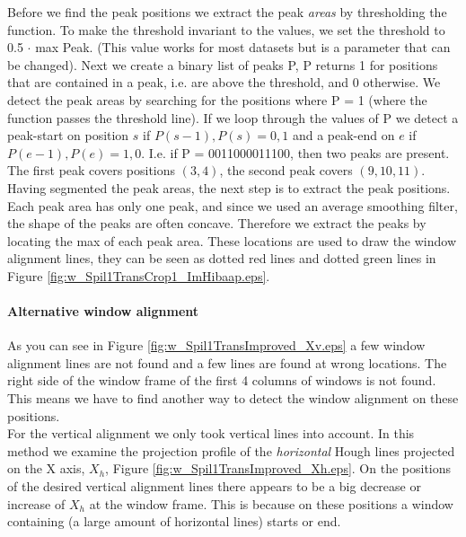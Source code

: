 Before we find the peak positions we extract the peak \emph{areas} by thresholding the
function. To make the threshold invariant to the values, we set the threshold to 0.5 $\cdot$ max Peak. 
(This value works for most datasets but is a parameter that can be changed).
Next we create a binary list of peaks P, P returns 1 for positions that are contained in
a peak, i.e. are above the threshold, and 0 otherwise.
We detect the peak areas by searching for the positions where P = 1
(where the function passes the threshold line). 
If we loop through the values of P we detect a peak-start on position $s$ if ${P(s-1),P(s)}={0,1}$
and a peak-end on $e$ if ${P(e-1),P(e)}={1,0}$. 
I.e. if P = 0011000011100, then two peaks are present. The first peak covers positions $(3,4)$, 
the second peak covers $(9,10,11)$.\\

Having segmented the peak areas, the next step is to extract the peak positions. 
Each peak area has only one peak, and since we used an average smoothing filter, the shape of 
the peaks are often concave. Therefore we extract the peaks by locating the max of each peak area. 
These locations are used to draw the window alignment lines, they can be seen
as dotted red lines and dotted green lines in Figure \ref{fig:w_Spil1TransCrop1_ImHibaap.eps}.

\paragraph{Alternative window alignment}
As you can see in Figure \ref{fig:w_Spil1TransImproved_Xv.eps}
a few window alignment lines are not found and a few lines are found at wrong locations.
The right side of the window frame of the first 4 columns of windows is not found.
This means we have to find another way to detect the window alignment on these positions.\\

For the vertical alignment we only took vertical lines into account.
In this method we examine the projection profile of the \emph{horizontal} Hough lines
projected on the X axis, $X_h$, Figure \ref{fig:w_Spil1TransImproved_Xh.eps}.
On the positions of the desired vertical alignment lines there appears to be a 
big decrease or increase of $X_h$ at the window frame. This is because on these
positions a window containing (a large amount of horizontal lines) starts or end.

